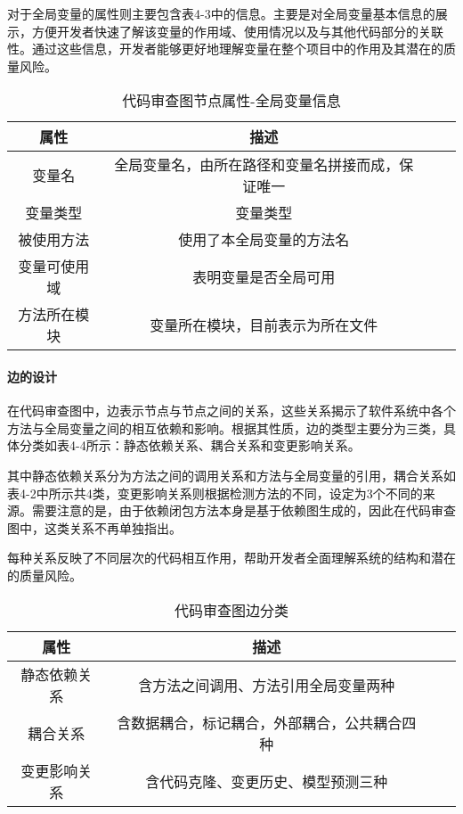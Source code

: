 对于全局变量的属性则主要包含表4-3中的信息。主要是对全局变量基本信息的展示，方便开发者快速了解该变量的作用域、使用情况以及与其他代码部分的关联性。通过这些信息，开发者能够更好地理解变量在整个项目中的作用及其潜在的质量风险。

\begin{table}[htbp]
\caption{代码审查图节点属性-全局变量信息}
\vspace{0.5em}\centering\wuhao
\begin{tabular}{cccc}
\toprule
    属性 & 描述 \\
\midrule
变量名 & 全局变量名，由所在路径和变量名拼接而成，保证唯一  \\
变量类型 & 变量类型   \\
被使用方法 & 使用了本全局变量的方法名   \\
变量可使用域 & 表明变量是否全局可用   \\
方法所在模块 &  变量所在模块，目前表示为所在文件  \\  
\bottomrule
\end{tabular}
\end{table}


\paragraph{边的设计}

在代码审查图中，边表示节点与节点之间的关系，这些关系揭示了软件系统中各个方法与全局变量之间的相互依赖和影响。根据其性质，边的类型主要分为三类，具体分类如表4-4所示：静态依赖关系、耦合关系和变更影响关系。

其中静态依赖关系分为方法之间的调用关系和方法与全局变量的引用，耦合关系如表4-2中所示共4类，变更影响关系则根据检测方法的不同，设定为3个不同的来源。需要注意的是，由于依赖闭包方法本身是基于依赖图生成的，因此在代码审查图中，这类关系不再单独指出。

每种关系反映了不同层次的代码相互作用，帮助开发者全面理解系统的结构和潜在的质量风险。

\begin{table}[htbp]
\caption{代码审查图边分类}
\vspace{0.5em}\centering\wuhao
\begin{tabular}{cccc}
\toprule
属性 & 描述 \\
\midrule
静态依赖关系 & 含方法之间调用、方法引用全局变量两种  \\
耦合关系 & 含数据耦合，标记耦合，外部耦合，公共耦合四种   \\
变更影响关系 & 含代码克隆、变更历史、模型预测三种  \\
\bottomrule
\end{tabular}
\end{table}



